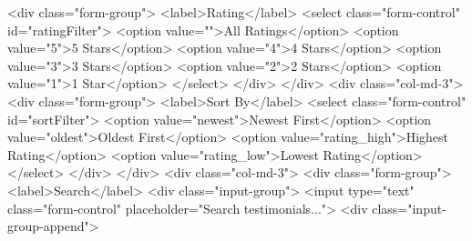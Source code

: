                                                         <div class="form-group">
                                                            <label>Rating</label>
                                                            <select class="form-control" id="ratingFilter">
                                                                <option value="">All Ratings</option>
                                                                <option value="5">5 Stars</option>
                                                                <option value="4">4 Stars</option>
                                                                <option value="3">3 Stars</option>
                                                                <option value="2">2 Stars</option>
                                                                <option value="1">1 Star</option>
                                                            </select>
                                                        </div>
                                                    </div>
                                                    <div class="col-md-3">
                                                        <div class="form-group">
                                                            <label>Sort By</label>
                                                            <select class="form-control" id="sortFilter">
                                                                <option value="newest">Newest First</option>
                                                                <option value="oldest">Oldest First</option>
                                                                <option value="rating_high">Highest Rating</option>
                                                                <option value="rating_low">Lowest Rating</option>
                                                            </select>
                                                        </div>
                                                    </div>
                                                    <div class="col-md-3">
                                                        <div class="form-group">
                                                            <label>Search</label>
                                                            <div class="input-group">
                                                                <input type="text" class="form-control" placeholder="Search testimonials...">
                                                                <div class="input-group-append">
